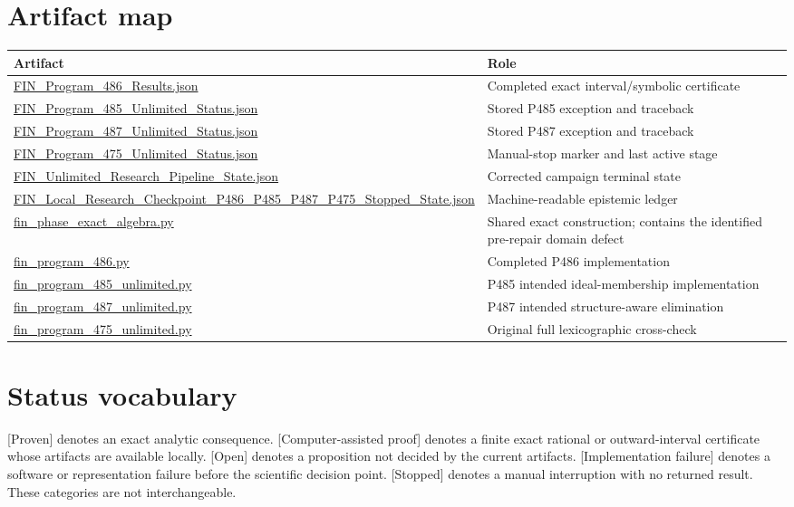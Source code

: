 \documentclass[11pt,a4paper,openany]{report}
\newcommand{\statusProven}{\textcolor{fingreen}{[Proven]}}
\newcommand{\statusCAP}{\textcolor{fingreen}{[Computer-assisted proof]}}
\newcommand{\statusOpen}{\textcolor{finorange}{[Open]}}
\newcommand{\statusStopped}{\textcolor{finred}{[Stopped]}}
\newcommand{\statusFailed}{\textcolor{finred}{[Implementation failure]}}
\begin{document}
\appendix
\chapter{Artifact map}

\begin{center}\small
\begin{longtable}{@{}p{}p{}@{}}
\toprule
\textbf{Artifact} & \textbf{Role}\\ \midrule\endhead
\url{FIN_Program_486_Results.json} & Completed exact interval/symbolic certificate\\
\url{FIN_Program_485_Unlimited_Status.json} & Stored P485 exception and traceback\\
\url{FIN_Program_487_Unlimited_Status.json} & Stored P487 exception and traceback\\
\url{FIN_Program_475_Unlimited_Status.json} & Manual-stop marker and last active stage\\
\url{FIN_Unlimited_Research_Pipeline_State.json} & Corrected campaign terminal state\\
\url{FIN_Local_Research_Checkpoint_P486_P485_P487_P475_Stopped_State.json} & Machine-readable epistemic ledger\\
\url{fin_phase_exact_algebra.py} & Shared exact construction; contains the identified pre-repair domain defect\\
\url{fin_program_486.py} & Completed P486 implementation\\
\url{fin_program_485_unlimited.py} & P485 intended ideal-membership implementation\\
\url{fin_program_487_unlimited.py} & P487 intended structure-aware elimination\\
\url{fin_program_475_unlimited.py} & Original full lexicographic cross-check\\
\bottomrule
\end{longtable}
\end{center}

\chapter{Status vocabulary}

\statusProven{} denotes an exact analytic consequence. \statusCAP{} denotes
a finite exact rational or outward-interval certificate whose artifacts are
available locally. \statusOpen{} denotes a proposition not decided by the
current artifacts. \statusFailed{} denotes a software or representation
failure before the scientific decision point. \statusStopped{} denotes a
manual interruption with no returned result. These categories are not
interchangeable.
\end{document}
